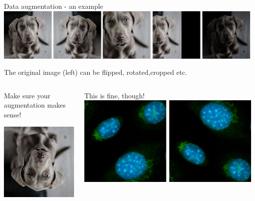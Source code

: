 \documentclass[9pt, aspectratio=169]{beamer}
\begin{document}
\begin{frame}
    {Data augmentation - an example}
    \centering \includegraphics[width=\textwidth]{data augmentation.png}

    The original image (left) can be flipped, rotated,cropped etc.

    \pause
    \begin{columns}
        \begin{column}{.5\textwidth}
            \centering
            Make sure your augmentation makes sense!

            \includegraphics[width=.5\textwidth]{data augmentation wrong.png}
        \end{column}
        \pause

        \begin{column}{.5\textwidth}
            \centering
            This is fine, though!
            \includegraphics[width=\textwidth]{cellsupsidedown.png}
        \end{column}

    \end{columns}
\end{frame}
\end{document}
